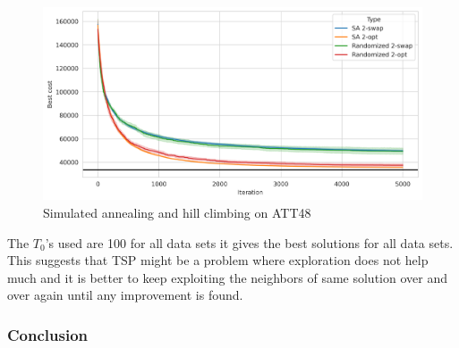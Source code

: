 \begin{figure}
    \centering
    \includegraphics[height=0.27\textheight]{images/att48-with-hc.png}
    \caption{Simulated annealing and hill climbing on ATT48}
    \label{fig:att48}
\end{figure}

The \(T_0\)'s used are 100 for all data sets it gives the best solutions for all data sets. This suggests that TSP might be a problem where exploration does not help much and it is better to keep exploiting the neighbors of same solution over and over again until any improvement is found.




\subsubsection*{Conclusion}

